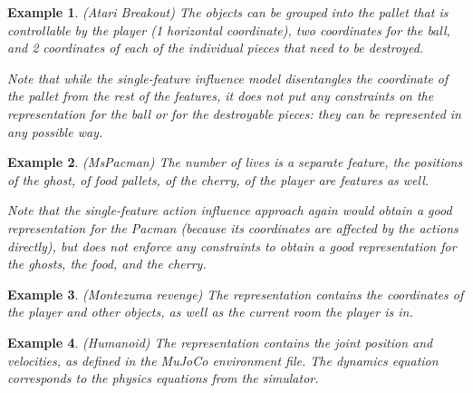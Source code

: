 \documentclass[a4paper,11pt,oneside]{report}
\newtheorem{example}{Example}[section]
\begin{document}
\begin{example}{(Atari Breakout)}
    The objects can be grouped into the pallet that is controllable by the player (1 horizontal coordinate), two coordinates for the ball, and 2 coordinates of each of the individual pieces that need to be destroyed.

    Note that while the single-feature influence model disentangles the coordinate of the pallet from the rest of the features, it does not put any constraints on the representation for the ball or for the destroyable pieces: they can be represented in any possible way.
\end{example}

\begin{example}{(MsPacman)}
   The number of lives is a separate feature, the positions of the ghost, of food pallets, of the cherry, of the player are features as well.

   Note that the single-feature action influence approach again would obtain a good representation for the Pacman (because its coordinates are affected by the actions directly), but does not enforce any constraints to obtain a good representation for the ghosts, the food, and the cherry.
\end{example}

\begin{example}{(Montezuma revenge)}
    The representation contains the coordinates of the player and other objects, as well as the current room the player is in.
\end{example}

\begin{example}{(Humanoid)}
    The representation contains the joint position and velocities, as defined in the MuJoCo environment file. The dynamics equation corresponds to the physics equations from the simulator.
\end{example}
\end{document}

